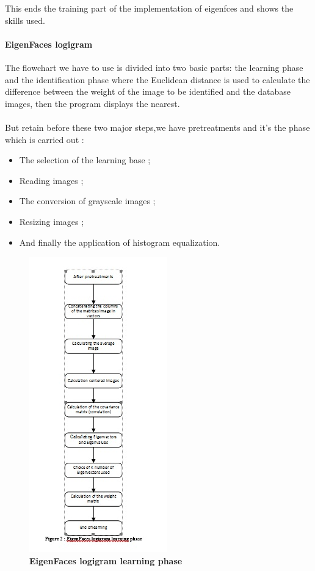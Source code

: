 This ends the training part of the implementation of eigenfces and shows the skills used.



\paragraph{EigenFaces logigram }

The flowchart we  have to use is  divided into two basic parts: the learning phase and the identification phase where the Euclidean distance is used to calculate the difference between the weight of the image to be identified and the database images, then the program displays the nearest.
\paragraph{}
But retain before these two major steps,we have  pretreatments and it’s the phase which is carried out :
\begin{itemize}
\item The selection of the learning base ;
\item Reading images ;
\item The conversion of grayscale images ;
\item Resizing images ;
\item And finally the application of histogram equalization.
\end{itemize}


\begin{figure}[bth]%
\begin{center}
\includegraphics[scale=0.75]{ef_learningphase}%
\caption{\textbf{EigenFaces logigram learning phase}}%
\label{ef_learningphase}%
\end {center}
\end{figure}	


